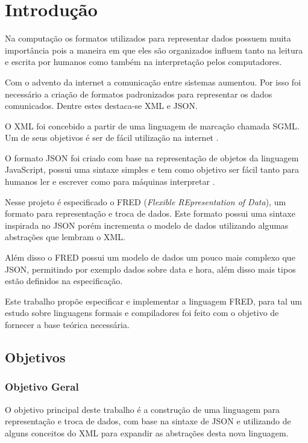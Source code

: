 \chapter[Introdução]{Introdução}

Na computação os formatos utilizados para representar dados
possuem muita importância pois a maneira em que eles são organizados
influem tanto na leitura e escrita por humanos como também 
na interpretação pelos computadores.

Com o advento da internet a comunicação entre sistemas aumentou.
Por isso foi necessário a criação de formatos padronizados para representar
os dados comunicados. Dentre estes destaca-se XML e JSON.

O XML foi concebido a partir de uma linguagem de marcação chamada SGML.
Um de seus objetivos é ser de fácil utilização na internet \cite{XML}.

O formato JSON foi criado com base na representação de objetos 
da linguagem JavaScript, possui uma sintaxe simples e tem como
objetivo ser fácil tanto para humanos ler e escrever como
para máquinas interpretar \cite{ecma404}.

Nesse projeto é especificado o FRED (\textit{Flexible REpresentation of Data}), 
um formato para representação e troca de dados. Este formato possui uma sintaxe
inspirada no JSON porém incrementa o modelo de dados utilizando algumas 
abstrações que lembram o XML.

Além disso o FRED possui um modelo de dados um pouco mais complexo que JSON,
permitindo por exemplo dados sobre data e hora, além disso mais tipos estão
definidos na especificação.

Este trabalho propõe especificar e implementar a linguagem FRED, para tal
um estudo sobre linguagens formais e compiladores foi feito com o objetivo
de fornecer a base teórica necessária.

\section{Objetivos}
\label{sec:objective}

\subsection{Objetivo Geral}

O objetivo principal deste trabalho é a construção de uma linguagem para
representação e troca de dados, com base na sintaxe de JSON e
utilizando de alguns conceitos do XML para expandir as abstrações 
desta nova linguagem.

